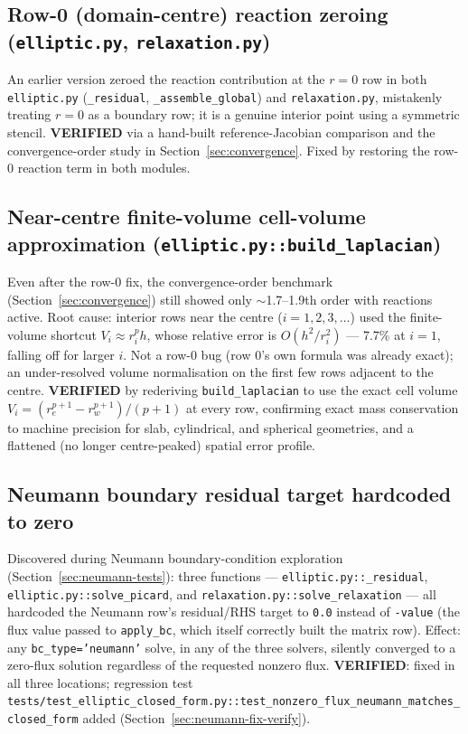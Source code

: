 \documentclass[11pt]{article}
\newcommand{\verified}{\textcolor{green!45!black}{\textbf{VERIFIED}}}
\newcommand{\code}[1]{\texttt{#1}}
\newcommand{\test}[1]{\texttt{\small #1}}
\begin{document}
\subsection{Row-0 (domain-centre) reaction zeroing (\code{elliptic.py}, \code{relaxation.py})}
An earlier version zeroed the reaction contribution at the $r=0$ row in both
\code{elliptic.py} (\code{\_residual}, \code{\_assemble\_global}) and
\code{relaxation.py}, mistakenly treating $r=0$ as a boundary row; it is a
genuine interior point using a symmetric stencil. \verified{} via a hand-built
reference-Jacobian comparison and the convergence-order study in
Section~\ref{sec:convergence}. Fixed by restoring the row-0 reaction term in
both modules.

\subsection{Near-centre finite-volume cell-volume approximation (\code{elliptic.py::build\_laplacian})}
\label{sec:fv-fix}
Even after the row-0 fix, the convergence-order benchmark
(Section~\ref{sec:convergence}) still showed only $\sim$1.7--1.9th order with
reactions active. Root cause: interior rows near the centre ($i{=}1,2,3,\dots$)
used the finite-volume shortcut $V_i \approx r_i^p h$, whose relative error is
$O(h^2/r_i^2)$ --- 7.7\% at $i{=}1$, falling off for larger $i$. Not a row-0
bug (row 0's own formula was already exact); an under-resolved volume
normalisation on the first few rows adjacent to the centre. \verified{} by
rederiving \code{build\_laplacian} to use the exact cell volume
$V_i=(r_e^{p+1}-r_w^{p+1})/(p+1)$ at every row, confirming exact mass
conservation to machine precision for slab, cylindrical, and spherical
geometries, and a flattened (no longer centre-peaked) spatial error profile.

\subsection{Neumann boundary residual target hardcoded to zero}
\label{sec:neumann-bug}
Discovered during Neumann boundary-condition exploration
(Section~\ref{sec:neumann-tests}): three functions ---
\code{elliptic.py::\_residual}, \code{elliptic.py::solve\_picard}, and
\code{relaxation.py::solve\_relaxation} --- all hardcoded the Neumann row's
residual/RHS target to \code{0.0} instead of \code{-value} (the flux value
passed to \code{apply\_bc}, which itself correctly built the matrix row).
Effect: any \code{bc\_type='neumann'} solve, in any of the three solvers,
silently converged to a zero-flux solution regardless of the requested
nonzero flux. \verified{}: fixed in all three locations; regression test
\test{tests/test\_elliptic\_closed\_form.py::test\_nonzero\_flux\_neumann\_matches\_closed\_form}
added (Section~\ref{sec:neumann-fix-verify}).
\end{document}
